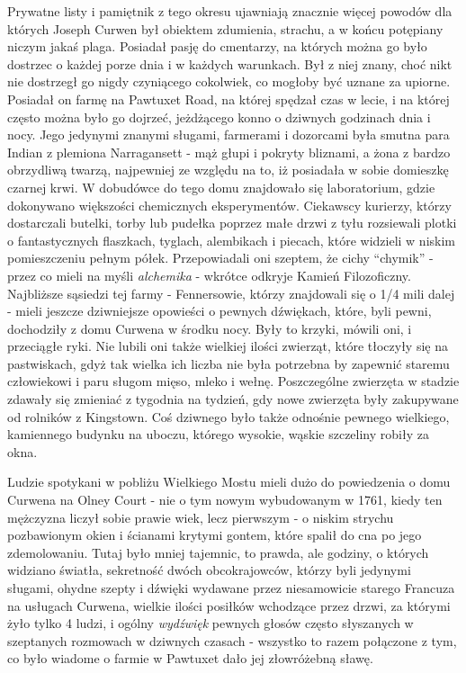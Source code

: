 Prywatne listy i pamiętnik z tego okresu ujawniają znacznie więcej powodów dla których Joseph Curwen był obiektem zdumienia, strachu, a w końcu potępiany niczym jakaś plaga. Posiadał pasję do cmentarzy, na których można go było dostrzec o każdej porze dnia i w każdych warunkach. Był z niej znany, choć nikt nie dostrzegł go nigdy czyniącego cokolwiek, co mogłoby być uznane za upiorne. Posiadał on farmę na Pawtuxet Road, na której spędzał czas w lecie, i na której często można było go dojrzeć, jeżdżącego konno o dziwnych godzinach dnia i nocy. Jego jedynymi znanymi sługami, farmerami i dozorcami była smutna para Indian z plemiona Narragansett - mąż głupi i pokryty bliznami, a żona z bardzo obrzydliwą twarzą, najpewniej ze względu na to, iż posiadała w sobie domieszkę czarnej krwi. W dobudówce do tego domu znajdowało się laboratorium, gdzie dokonywano większości chemicznych eksperymentów. Ciekawscy kurierzy, którzy dostarczali butelki, torby lub pudełka poprzez małe drzwi z tyłu rozsiewali plotki o fantastycznych flaszkach, tyglach, alembikach i piecach, które widzieli w niskim pomieszczeniu pełnym półek. Przepowiadali oni szeptem, że cichy ``chymik'' - przez co mieli na myśli \textit{alchemika} - wkrótce odkryje Kamień Filozoficzny. Najbliższe sąsiedzi tej farmy - Fennersowie, którzy znajdowali się o 1/4 mili dalej - mieli jeszcze dziwniejsze opowieści o pewnych dźwiękach, które, byli pewni, dochodziły z domu Curwena w środku nocy. Były to krzyki, mówili oni, i przeciągłe ryki. Nie lubili oni także wielkiej ilości zwierząt, które tłoczyły się na pastwiskach, gdyż tak wielka ich liczba nie była potrzebna by zapewnić staremu człowiekowi i paru sługom mięso, mleko i wełnę. Poszczególne zwierzęta w stadzie zdawały się zmieniać z tygodnia na tydzień, gdy nowe zwierzęta były zakupywane od rolników z Kingstown. Coś dziwnego było także odnośnie pewnego wielkiego, kamiennego budynku na uboczu, którego wysokie, wąskie szczeliny robiły za okna. 

Ludzie spotykani w pobliżu Wielkiego Mostu mieli dużo do powiedzenia o domu Curwena na Olney Court - nie o tym nowym wybudowanym w 1761, kiedy ten mężczyzna liczył sobie prawie wiek, lecz pierwszym - o niskim strychu pozbawionym okien i ścianami krytymi gontem, które spalił do cna po jego zdemolowaniu. Tutaj było mniej tajemnic, to prawda, ale godziny, o których widziano światła, sekretność dwóch obcokrajowców, którzy byli jedynymi sługami, ohydne szepty i dźwięki wydawane przez niesamowicie starego Francuza na usługach Curwena, wielkie ilości posiłków wchodzące przez drzwi, za którymi żyło tylko 4 ludzi, i ogólny \textit{wydźwięk} pewnych głosów często słyszanych w szeptanych rozmowach w dziwnych czasach - wszystko to razem połączone z tym, co było wiadome o farmie w Pawtuxet dało jej złowróżebną sławę.
 
